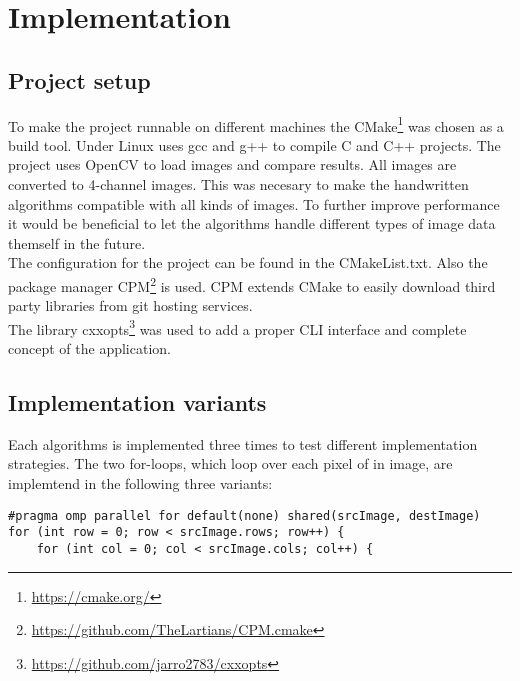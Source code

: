 \chapter{Implementation}

\section{Project setup}

To make the project runnable on different machines the CMake\footnote{\url{https://cmake.org/}} was chosen as a build tool. Under Linux uses gcc and g++ to compile C and C++ projects. The project uses OpenCV to load images and compare results. All images are converted to 4-channel images. This was necesary to make the handwritten algorithms compatible with all kinds of images. To further improve performance it would be beneficial to let the algorithms handle different types of image data themself in the future.\\

The configuration for the project can be found in the CMakeList.txt. Also the package manager CPM\footnote{\url{https://github.com/TheLartians/CPM.cmake}} is used. CPM extends CMake to easily download third party libraries from git hosting services.\\

The library cxxopts\footnote{\url{https://github.com/jarro2783/cxxopts}} was used to add a proper CLI interface and complete concept of the application.

\section{Implementation variants}

Each algorithms is implemented three times to test different implementation strategies. The two for-loops, which loop over each pixel of in image, are implemtend in the following three variants:

\begin{listing}
\begin{verbatim}
#pragma omp parallel for default(none) shared(srcImage, destImage)
for (int row = 0; row < srcImage.rows; row++) {
    for (int col = 0; col < srcImage.cols; col++) {
\end{verbatim}
\label{listing:forloop1}
\end{listing}



